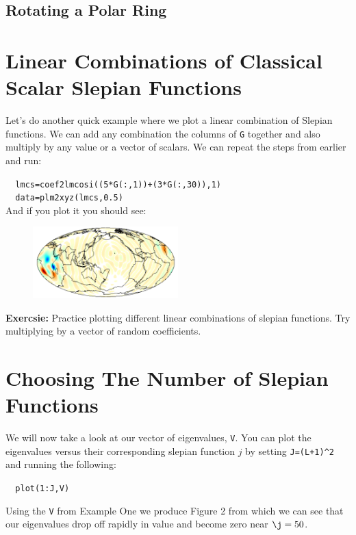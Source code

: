 \documentclass[11pt]{article}
\begin{document}
\subsection{Rotating a Polar Ring}



\section{Linear Combinations of Classical Scalar Slepian Functions}

Let's do another quick example where we plot a linear combination of Slepian functions. We can add any combination the columns of \verb+G+ together and also multiply by any value or a vector of scalars. We can repeat the steps from earlier and run:

\verb|	lmcs=coef2lmcosi((5*G(:,1))+(3*G(:,30)),1)| \\
\verb|	data=plm2xyz(lmcs,0.5)|\\

And if you plot it you should see:


\begin{figure}[H]
  \centering
  \includegraphics[width=0.5\textwidth]{figures/linCombExample.png}
\label{replace_me}
\end{figure}


\textbf{Exercsie:} Practice plotting different linear combinations of slepian functions. Try multiplying by a vector of random coefficients.


\section{Choosing The Number of Slepian Functions} 

We will now take a look at our vector of eigenvalues, \verb+V+. You can plot the eigenvalues versus their corresponding slepian function $j$ by setting \verb|J=(L+1)^2| and running the following:

\verb+	plot(1:J,V)+

Using the \verb|V| from Example One we produce Figure 2 from which we can see that our eigenvalues drop off rapidly in value and become zero near $\j=50$. 
\end{document}
